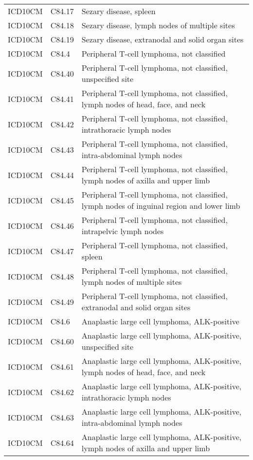 \begin{longtable}{p{}p{}p{}}
  ICD10CM & C84.17 & Sezary disease, spleen \\ 
  ICD10CM & C84.18 & Sezary disease, lymph nodes of multiple sites \\ 
  ICD10CM & C84.19 & Sezary disease, extranodal and solid organ sites \\ 
  ICD10CM & C84.4 & Peripheral T-cell lymphoma, not classified \\ 
  ICD10CM & C84.40 & Peripheral T-cell lymphoma, not classified, unspecified site \\ 
  ICD10CM & C84.41 & Peripheral T-cell lymphoma, not classified, lymph nodes of head, face, and neck \\ 
  ICD10CM & C84.42 & Peripheral T-cell lymphoma, not classified, intrathoracic lymph nodes \\ 
  ICD10CM & C84.43 & Peripheral T-cell lymphoma, not classified, intra-abdominal lymph nodes \\ 
  ICD10CM & C84.44 & Peripheral T-cell lymphoma, not classified, lymph nodes of axilla and upper limb \\ 
  ICD10CM & C84.45 & Peripheral T-cell lymphoma, not classified, lymph nodes of inguinal region and lower limb \\ 
  ICD10CM & C84.46 & Peripheral T-cell lymphoma, not classified, intrapelvic lymph nodes \\ 
  ICD10CM & C84.47 & Peripheral T-cell lymphoma, not classified, spleen \\ 
  ICD10CM & C84.48 & Peripheral T-cell lymphoma, not classified, lymph nodes of multiple sites \\ 
  ICD10CM & C84.49 & Peripheral T-cell lymphoma, not classified, extranodal and solid organ sites \\ 
  ICD10CM & C84.6 & Anaplastic large cell lymphoma, ALK-positive \\ 
  ICD10CM & C84.60 & Anaplastic large cell lymphoma, ALK-positive, unspecified site \\ 
  ICD10CM & C84.61 & Anaplastic large cell lymphoma, ALK-positive, lymph nodes of head, face, and neck \\ 
  ICD10CM & C84.62 & Anaplastic large cell lymphoma, ALK-positive, intrathoracic lymph nodes \\ 
  ICD10CM & C84.63 & Anaplastic large cell lymphoma, ALK-positive, intra-abdominal lymph nodes \\ 
  ICD10CM & C84.64 & Anaplastic large cell lymphoma, ALK-positive, lymph nodes of axilla and upper limb \\ 

\end{longtable}
